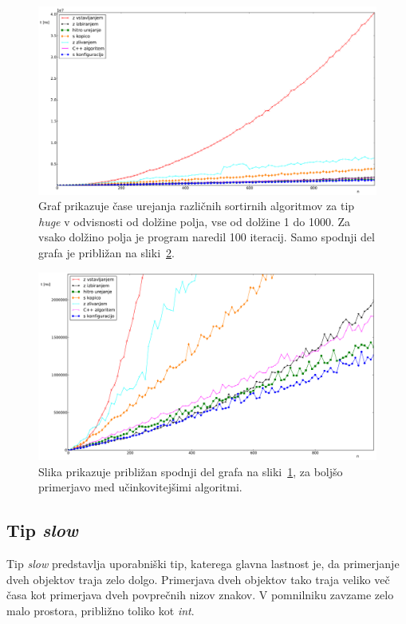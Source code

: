 \documentclass[a4paper,oneside,12pt]{article}
\begin{document}
\begin{figure}[h!]
    \includegraphics[width=\textwidth]{slike/huge1000.pdf}
    \vspace{-0.7cm}
    \caption[Rezultati za tip \emph{huge}, 1000 el.]{Graf prikazuje čase
    urejanja različnih sortirnih algoritmov za tip \emph{huge} v odvisnosti od dolžine polja, vse
    od dolžine 1 do 1000. Za vsako dolžino polja je program naredil 100 iteracij.
    Samo spodnji del grafa je približan na sliki~\ref{fig:rez:hugeblizu}.}
    \label{fig:rez:huge1000}
\end{figure}

\begin{figure}[h!]
    \includegraphics[width=\textwidth]{slike/huge1000zoom.pdf}
    \vspace{-0.7cm}
    \caption[Rezultati za tip \emph{huge}, 1000 el. -- približano]{Slika
    prikazuje približan spodnji del grafa na sliki~\ref{fig:rez:huge1000}, za
    boljšo primerjavo med učinkovitejšimi algoritmi. }
    \label{fig:rez:hugeblizu}
\end{figure}
\pagebreak

\subsection{Tip \emph{slow}}
\label{chapter:rez:slow}
Tip \emph{slow} predstavlja uporabniški tip, katerega glavna lastnost je, da primerjanje dveh objektov
traja zelo dolgo. Primerjava dveh objektov tako traja veliko več časa kot primerjava dveh povprečnih
nizov znakov. V pomnilniku zavzame zelo malo prostora, približno toliko kot \emph{int}.
\end{document}
